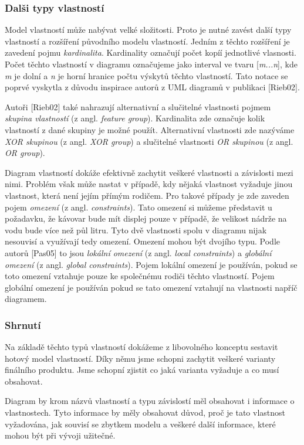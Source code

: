\subsubsection{Dalši typy vlastností}
Model vlastností může nabývat velké složitosti. Proto je nutné zavést další typy vlastností a rozšíření původního modelu vlastností. Jedním z těchto rozšíření je zavedení pojmu \textit{kardinalita}. Kardinality označují počet kopíí jednotlivé vlasnosti. Počet těchto vlastností v diagramu označujeme jako interval ve tvaru [\textit{m...n}], kde \textit{m} je dolní a \textit{n} je horní hranice počtu výskytů těchto vlastností. Tato notace se poprvé vyskytla z důvodu inspirace autorů z UML diagramů v publikaci [Rieb02].

Autoři [Rieb02] také nahrazují alternativní a slučitelné vlastnosti pojmem \textit{skupina vlastností} (z angl. \textit{feature group}). Kardinalita zde označuje kolik vlastností z dané skupiny je možné použít. Alternativní vlastnosti zde nazýváme \textit{XOR skupinou} (z angl. \textit{XOR group}) a slučitelné vlastnosti \textit{OR skupinou} (z angl. \textit{OR group}).

Diagram vlastností dokáže efektivně zachytit veškeré vlastnosti a závislosti mezi nimi. Problém však může nastat v případě, kdy nějaká vlastnost vyžaduje jinou vlastnost, která není jejím přímým rodičem. Pro takové případy je zde zaveden pojem \textit{omezení} (z angl. \textit{constraints}). Tato omezení si můžeme představit u požadavku, že kávovar bude mít displej pouze v případě, že velikost nádrže na vodu bude více než půl litru. Tyto dvě vlastnosti spolu v diagramu nijak nesouvisí a využívají tedy omezení. Omezení mohou být dvojího typu. Podle autorů [Pas05] to jsou \textit{lokální omezení} (z angl. \textit{local constraints}) a \textit{globální omezení} (z angl. \textit{global constraints}). Pojem lokální omezení je používán, pokud se toto omezení vztahuje pouze ke společnému rodiči těchto vlastností. Pojem globální omezení je používán pokud se tato omezení vztahují na vlastnosti napříč diagramem. 


\subsubsection{Shrnutí}
Na základě těchto typů vlastností dokážeme z libovolného konceptu sestavit hotový model vlastností. Díky němu jsme schopni zachytit veškeré varianty finálního produktu. Jsme schopní zjistit co jaká varianta vyžaduje a co musí obsahovat. 

Diagram by krom názvů vlastností a typu závislostí měl obsahovat i informace o vlastnostech. Tyto informace by měly obsahovat důvod, proč je tato vlastnost vyžadována, jak souvisí se zbytkem modelu a veškeré další informace, které mohou být při vývoji užitečné. 







